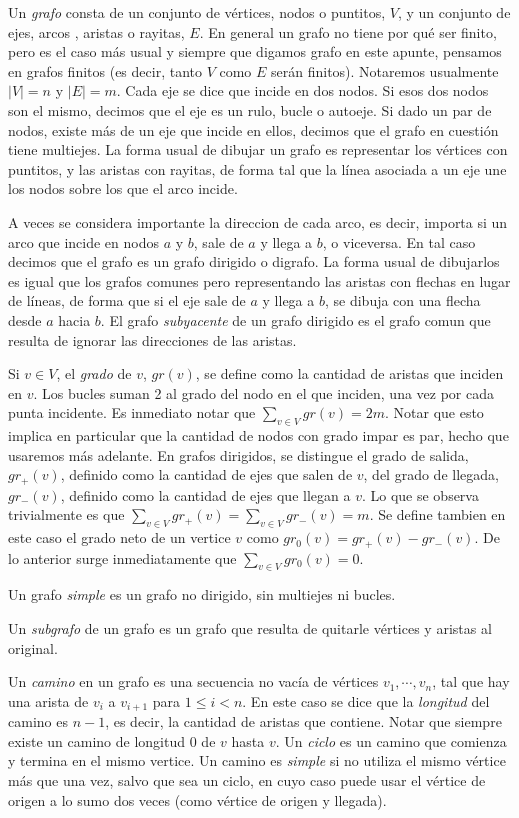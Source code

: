 \documentclass{article}
\begin{document}
Un \textit{grafo} consta de un conjunto de vértices, nodos o puntitos, $V$, y un conjunto de ejes, arcos , aristas o rayitas, $E$. En general un grafo no tiene por qué ser finito, pero es el caso más usual y siempre que digamos grafo en este apunte, pensamos en grafos finitos (es decir, tanto $V$ como $E$ serán finitos). Notaremos usualmente $|V| = n$ y $|E| = m$. Cada eje se dice que incide en dos nodos. Si esos dos nodos son el mismo, decimos que el eje es un rulo, bucle o autoeje. Si dado un par de nodos, existe más de un eje que incide en ellos, decimos que el grafo en cuestión tiene multiejes. La forma usual de dibujar un grafo es representar los vértices con puntitos, y las aristas con rayitas, de forma tal que la línea asociada a un eje une los nodos sobre los que el arco incide.

A veces se considera importante la direccion de cada arco, es decir, importa si un arco que incide en nodos $a$ y $b$, sale de $a$ y llega a $b$, o viceversa. En tal caso decimos que el grafo es un grafo dirigido o digrafo. La forma usual de dibujarlos es igual que los grafos comunes pero representando las aristas con flechas en lugar de líneas, de forma que si el eje sale de $a$ y llega a $b$, se dibuja con una flecha desde $a$ hacia $b$. El grafo \textit{subyacente} de un grafo dirigido es el grafo comun que resulta de ignorar las direcciones de las aristas.

Si $v \in V$, el \textit{grado} de $v$, $gr(v)$, se define como la cantidad de aristas que inciden en $v$. Los bucles suman 2 al grado del nodo en el que inciden, una vez por cada punta incidente. Es inmediato notar que $\sum_{v \in V}{gr(v)} = 2m$. Notar que esto implica en particular que la cantidad de nodos con grado impar es par, hecho que usaremos más adelante. En grafos dirigidos, se distingue el grado de salida, $gr_+(v)$, definido como la cantidad de ejes que salen de $v$, del grado de llegada, $gr_-(v)$, definido como la cantidad de ejes que llegan a $v$. Lo que se observa trivialmente es que $\sum_{v \in V}{gr_+(v)} = \sum_{v \in V}{gr_-(v)} = m$. Se define tambien en este caso el grado neto de un vertice $v$ como $gr_0(v) = gr_+(v) - gr_-(v)$. De lo anterior surge inmediatamente que $\sum_{v \in V}{gr_0(v)} = 0$.

Un grafo \textit{simple} es un grafo no dirigido, sin multiejes ni bucles.

Un \textit{subgrafo} de un grafo es un grafo que resulta de quitarle vértices y aristas al original. 

Un \textit{camino} en un grafo es una secuencia no vacía de vértices $v_1,\cdots,v_n$, tal que hay una arista de $v_i$ a $v_{i+1}$ para $1\leq i < n$. En este caso se dice que la \textit{longitud} del camino es $n-1$, es decir, la cantidad de aristas que contiene. Notar que siempre existe un camino de longitud 0 de $v$ hasta $v$. Un \textit{ciclo} es un camino que comienza y termina en el mismo vertice. Un camino es \textit{simple} si no utiliza el mismo vértice más que una vez, salvo que sea un ciclo, en cuyo caso puede usar el vértice de origen a lo sumo dos veces (como vértice de origen y llegada).
\end{document}
